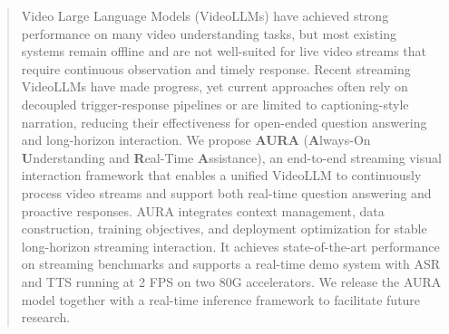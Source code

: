 \begin{abstract}
Video Large Language Models (VideoLLMs) have achieved strong performance on many video understanding tasks, but most existing systems remain offline and are not well-suited for live video streams that require continuous observation and timely response. Recent streaming VideoLLMs have made progress, yet current approaches often rely on decoupled trigger-response pipelines or are limited to captioning-style narration, reducing their effectiveness for open-ended question answering and long-horizon interaction. We propose \textbf{AURA} (\textbf{A}lways-On \textbf{U}nderstanding and \textbf{R}eal-Time \textbf{A}ssistance), an end-to-end streaming visual interaction framework that enables a unified VideoLLM to continuously process video streams and support both real-time question answering and proactive responses. AURA integrates context management, data construction, training objectives, and deployment optimization for stable long-horizon streaming interaction. 
It achieves state-of-the-art performance on streaming benchmarks and supports a real-time demo system with ASR and TTS running at 2 FPS on two 80G accelerators.
We release the AURA model together with a real-time inference framework to facilitate future research.

\end{abstract}
